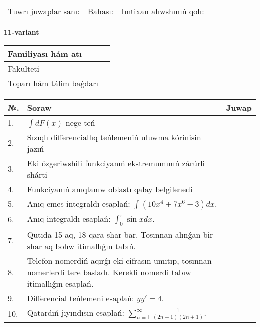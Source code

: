 \documentclass{article}
\begin{document}
\vspace{1cm}

\begin{tabular}{ c c c }
Tuwrı juwaplar sanı: \underline{\hspace{2cm}} & Bahası: \underline{\hspace{2cm}} & Imtixan alıwshınıń qolı: \underline{\hspace{2cm}} \\
\end{tabular}

\newpage

\begin{center}\textbf{11-variant}\end{center}

\bgroup
\def\arraystretch{1.5}
\begin{tabular}{ |m{6cm}|m{10cm}| }
  \hline
  Familiyası hám atı & \\
  \hline
  Fakulteti &\\
  \hline
  Toparı hám tálim baǵdarı & \\
  \hline
\end{tabular}
\egroup

\vspace{0.5cm}

\bgroup
\def\arraystretch{2}
\begin{tabular}{ |l|m{8cm}|m{7cm}| }
  \hline
  №. & Soraw & Juwap \\
  \hline
  1. & $\displaystyle\int dF(x)$ nege teń &  \\
  \hline
  2. & Sızıqlı differenciallıq teńlemeniń uluwma kórinisin jazıń &  \\
  \hline
  3. & Eki ózgeriwshili funkciyanıń ekstremumınıń zárúrli shárti &  \\
  \hline
  4. & Funkciyanıń anıqlanıw oblastı qalay belgilenedi &  \\
  \hline
  5. & Anıq emes integraldı esaplań: $\displaystyle\int \left( 10x^{4} + 7x^{6} - 3 \right)dx$. &  \\
  \hline
  6. & Anıq integraldı esaplań: $\displaystyle\int_{0}^{\pi}\sin xdx$. &  \\
  \hline
  7. & Qutıda 15 aq, 18 qara shar bar. Tosınnan alınǵan bir shar aq bolıw itimallıǵın tabıń. &  \\
  \hline
  8. & Telefon nomerdiń aqırǵı eki cifrasın umıtıp, tosınnan nomerlerdi tere basladı. Kerekli nomerdi tabıw itimallıǵın esaplań. &  \\
  \hline
  9. & Differencial teńlemeni esaplań: $yy'= 4$. &  \\
  \hline
  10. & Qatardıń jıyındısın esaplań: $\displaystyle\sum_{n = 1}^{\infty}\frac{1}{(2n - 1)(2n + 1)}$. &  \\
  \hline
\end{tabular}
\egroup
\end{document}
